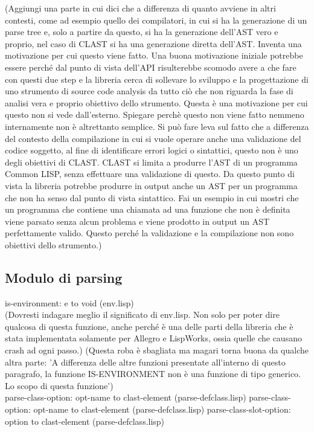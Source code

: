(Aggiungi una parte in cui dici che a differenza di quanto avviene in altri contesti, come ad esempio quello dei compilatori, in cui si ha la generazione di un parse tree e, solo a partire da questo, si ha la generazione dell'AST vero e proprio, nel caso di CLAST si ha una generazione diretta dell'AST. Inventa una motivazione per cui questo viene fatto. Una buona motivazione iniziale potrebbe essere perché dal punto di vista dell'API risulterebbe scomodo avere a che fare con questi due step e la libreria cerca di sollevare lo sviluppo e la progettazione di uno strumento di source code analysis da tutto ciò che non riguarda la fase di analisi vera e proprio obiettivo dello strumento. Questa è una motivazione per cui questo non si vede dall'esterno. Spiegare perchè questo non viene fatto nemmeno internamente non è altrettanto semplice. Si può fare leva sul fatto che a differenza del contesto della compilazione in cui si vuole operare anche una validazione del codice soggetto, al fine di identificare errori logici o sintattici, questo non è uno degli obiettivi di CLAST. CLAST si limita a produrre l'AST di un programma Common LISP, senza effettuare una validazione di questo. Da questo punto di vista la libreria potrebbe produrre in output anche un AST per un programma che non ha senso dal punto di vista sintattico. Fai un esempio in cui mostri che un programma che contiene una chiamata ad una funzione che non è definita viene parsato senza alcun problema e viene prodotto in output un AST perfettamente valido. Questo perché la validazione e la compilazione non sono obiettivi dello strumento.)

\subsection{Modulo di parsing}

is-environment: e to void (env.lisp)\\

(Dovresti indagare meglio il significato di env.lisp. Non solo per poter dire qualcosa di questa funzione, anche perché è una delle parti della libreria che è stata implementata solamente per Allegro e LispWorks, ossia quelle che causano crash ad ogni passo.)
(Questa roba è sbagliata ma magari torna buona da qualche altra parte: 'A differenza delle altre funzioni presentate all'interno di questo paragrafo, la funzione IS-ENVIRONMENT non è una funzione di tipo generico. Lo scopo di questa funzione')\\

parse-class-option: opt-name to clast-element (parse-defclass.lisp)
parse-class-option: opt-name to clast-element (parse-defclass.lisp)
parse-class-slot-option: option to clast-element (parse-defclass.lisp)\\

